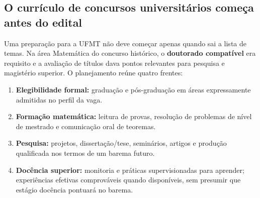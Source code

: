 \documentclass[11pt,a4paper]{article}
\begin{document}
\subsection{O currículo de concursos universitários começa antes do edital}
Uma preparação para a UFMT não deve começar apenas quando sai a lista de temas. Na área Matemática do concurso histórico, o \textbf{doutorado compatível} era requisito e a avaliação de títulos dava pontos relevantes para pesquisa e magistério superior. O planejamento reúne quatro frentes:
\begin{enumerate}
\item \textbf{Elegibilidade formal:} graduação e pós-graduação em áreas expressamente admitidas no perfil da vaga.
\item \textbf{Formação matemática:} leitura de provas, resolução de problemas de nível de mestrado e comunicação oral de teoremas.
\item \textbf{Pesquisa:} projetos, dissertação/tese, seminários, artigos e produção qualificada nos termos de um barema futuro.
\item \textbf{Docência superior:} monitoria e práticas supervisionadas para aprender; experiências efetivas comprováveis quando disponíveis, sem presumir que estágio docência pontuará no barema.
\end{enumerate}
\end{document}
